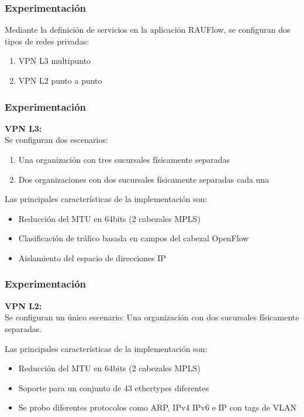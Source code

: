 \documentclass{beamer}
\begin{document}
\begin{frame}
\frametitle{Experimentaci\'on} 

Mediante la definici\'on de servicios en la aplicaci\'on RAUFlow, se configuran dos tipos de redes privadas:
\begin{enumerate}
\item VPN L3 multipunto
\item VPN L2 punto a punto 
\end{enumerate}


\end{frame}

\begin{frame}
\frametitle{Experimentaci\'on} 

\textbf{VPN L3:}\\

Se configuran dos escenarios:

\begin{enumerate}
\item Una organizaci\'on con tres sucursales f\'isicamente separadas
\item Dos organizaciones con dos sucursales f\'isicamente separadas cada una
\end{enumerate}

\vspace{0.4cm}

Las principales características de la implementaci\'on son:
\begin{itemize}
\item Reducci\'on del MTU en 64bits (2 cabezales MPLS)
\item Clasificaci\'on de tr\'afico basada en campos del cabezal OpenFlow
\item Aislamiento del espacio de direcciones IP
\end{itemize}


\end{frame}

\begin{frame}
\frametitle{Experimentaci\'on} 

\textbf{VPN L2:}\\

Se configuran un \'unico escenario: Una organizaci\'on con dos sucursales f\'isicamente separadas.

\vspace{0.4cm}

Las principales características de la implementaci\'on son:
\begin{itemize}
\item Reducci\'on del MTU en 64bits (2 cabezales MPLS)
\item Soporte para un conjunto de 43 ethertypes diferentes
\item Se probo diferentes protocolos como ARP, IPv4 IPv6 e IP con tags de VLAN
\end{itemize}


\end{frame}
\end{document}
